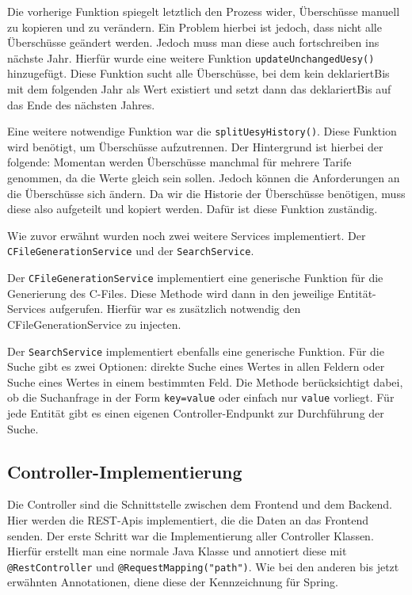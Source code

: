 Die vorherige Funktion spiegelt letztlich den Prozess wider, Überschüsse manuell zu kopieren und zu verändern. Ein Problem hierbei ist jedoch, dass nicht alle Überschüsse geändert werden.
Jedoch muss man diese auch fortschreiben ins nächste Jahr. Hierfür wurde eine weitere Funktion \texttt{updateUnchangedUesy()}  hinzugefügt. Diese Funktion sucht alle Überschüsse, bei dem kein 
deklariertBis mit dem folgenden Jahr als Wert existiert und setzt dann das deklariertBis auf das Ende des nächsten Jahres.

Eine weitere notwendige Funktion war die \texttt{splitUesyHistory()}. Diese Funktion wird benötigt, um Überschüsse aufzutrennen. Der Hintergrund ist hierbei der folgende: Momentan werden Überschüsse
manchmal für mehrere Tarife genommen, da die Werte gleich sein sollen. Jedoch können die Anforderungen an die Überschüsse sich ändern. Da wir die Historie der Überschüsse benötigen, muss 
diese also aufgeteilt und kopiert werden. Dafür ist diese Funktion zuständig.

Wie zuvor erwähnt wurden noch zwei weitere Services implementiert. Der \texttt{CFile\-Generation\-Service} und der \texttt{SearchService}.

Der \texttt{CFileGenerationService} implementiert eine generische Funktion für die 
Generierung des C-Files. Diese Methode wird dann in den jeweilige Entität-Services aufgerufen. Hierfür war es zusätzlich notwendig den CFileGenerationService zu injecten.

Der \texttt{SearchService} implementiert ebenfalls eine generische Funktion. Für die Suche gibt es zwei Optionen: direkte Suche eines Wertes in allen Feldern oder Suche eines Wertes in einem 
bestimmten Feld. Die Methode berücksichtigt dabei, ob die Suchanfrage in der Form \texttt{key=value} oder einfach nur \texttt{value} vorliegt. 
Für jede Entität gibt es einen eigenen Controller-Endpunkt zur Durchführung der Suche.

\subsection{Controller-Implementierung}
Die Controller sind die Schnittstelle zwischen dem Frontend und dem Backend. Hier werden die REST-Apis implementiert, die die Daten an das Frontend senden.
Der erste Schritt war die Implementierung aller Controller Klassen. Hierfür erstellt man eine normale Java Klasse und annotiert diese mit \texttt{@RestController} und \texttt{@RequestMapping("path")}.
Wie bei den anderen bis jetzt erwähnten Annotationen, diene diese der Kennzeichnung für Spring.


